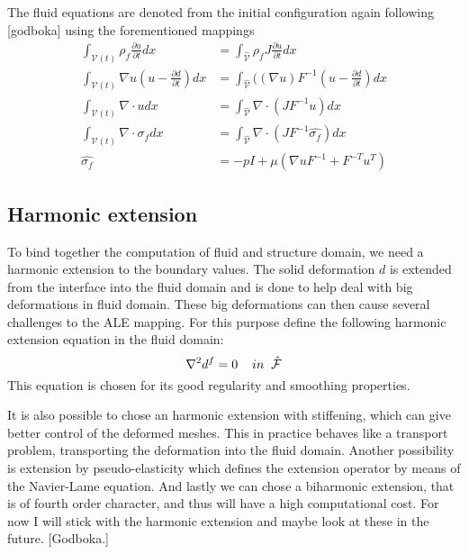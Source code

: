 The fluid equations are denoted from the initial configuration again following [godboka] using the forementioned mappings
\begin{align}
\int_{\mathcal{V}(t)} \rho_f \frac{\partial u}{\partial t} dx & = \int_{\hat{\mathcal{V}}}  \rho_f J \frac{\partial u}{\partial t} dx \\
\int_{\mathcal{V}(t)} \nabla u (u-\frac{\partial d}{\partial t}) dx  &= \int_{\hat{\mathcal{V}}} ((\nabla u)F^{-1}(u-\frac{\partial d}{\partial t}) dx  \\
\int_{\mathcal{V}(t)} \nabla \cdot u dx  &=\int_{\hat{\mathcal{V}}}  \nabla \cdot (J F^{-1} u  ) dx \\
\int_{\mathcal{V}(t)} \nabla \cdot \sigma_f dx &= \int_{\hat{\mathcal{V}}} \nabla \cdot( J F^{-1} \hat{\sigma_f} )     dx \\
\hat{\sigma_f} &= -pI + \mu ( \nabla u F^{-1} + F^{-T} u^{T}  ) 
\end{align}
 

\subsection*{Harmonic extension}
To bind together the computation of fluid and structure domain, we need a harmonic extension to the boundary values. The solid deformation $d$ is extended from the interface into the fluid domain and is done to help deal with big deformations in fluid domain. These big deformations can then cause several challenges to the ALE mapping. 
For this purpose define the following harmonic extension equation in the fluid domain:
$$ \nabla^2 d^f = 0\hspace{4mm}in \hspace{2mm} \mathcal{\hat{F}}$$ 
This equation is chosen for its good regularity and smoothing properties.

It is also possible to chose an harmonic extension with stiffening, which can give better control of the deformed meshes. This in practice behaves like a transport problem, transporting the deformation into the fluid domain. Another possibility is extension by pseudo-elasticity which defines the extension operator by means of the Navier-Lame equation. And lastly we can chose a biharmonic extension, that is of fourth order character, and thus will have a high computational cost. For now I will stick with the harmonic extension and maybe look at these in the future. [Godboka.]

